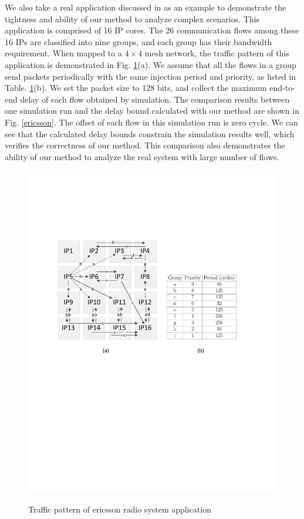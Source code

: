 \documentclass[preprint]{elsarticle}
\begin{document}
We also take a real application discussed in \cite{LuJa08}\cite{Jafari1922089} as an example to demonstrate the tightness and ability of our method to analyze complex scenarios. This application is comprised of 16 IP cores. The 26 communication flows among these 16 IPs are classified into nine groups, and each group has their bandwidth requirement. When mapped to a $4\times 4$ mesh network, the traffic pattern of this application is demonstrated in Fig. \ref{trafficpattern}(a). We assume that all the flows in a group send packets periodically with the same injection period and priority, as listed in Table. \ref{trafficpattern}(b). We set the packet size to 128 bits, and collect the maximum end-to-end delay of each flow obtained by simulation. The comparison results between one simulation run and the delay bound calculated  with our method are shown in Fig. \ref{ericsson}. The offset of each flow in this simulation run is zero cycle. We can see that the calculated delay bounds constrain the simulation results well, which verifies the correctness of our method. This comparison also demonstrates the ability of our method to analyze the real system with large number of flows.
\begin{figure}
  \centering
  \includegraphics[scale=0.7]{fig11.pdf}\\
  \caption{Traffic pattern of ericsson radio system application}\label{trafficpattern}
\end{figure}
\end{document}
